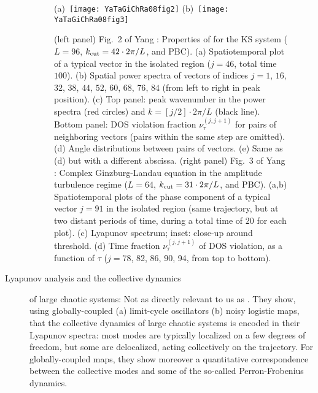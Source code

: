 \begin{description}
\begin{figure}
 (a)~\texttt{[image: YaTaGiChRa08fig2]}
 (b)~\texttt{[image: YaTaGiChRa08fig3]}
\caption{
(left panel)
Fig.~2 of Yang \etal{}:
Properties of {\cLvs} for the KS system
($L = 96$, $k_{\rm cut} = 42 \cdot 2\pi/L$, and PBC).
(a) Spatiotemporal plot of a typical vector in the isolated region
($j=46$, total time $100$).
(b) Spatial power spectra of vectors of indices
$j = 1$, $16$, $32$, $38$, $44$, $52$, $60$, $68$, $76$, $84$
(from left to right in peak position).
(c) Top panel: peak wavenumber in the power spectra (red circles)
and $k = [j/2] \cdot 2\pi/L$ (black line).
Bottom panel: DOS violation fraction $\nu^{(j,j+1)}_\tau$ for pairs of
neighboring vectors (pairs within the same step are omitted).
(d) Angle distributions between pairs of vectors.
(e) Same as (d) but with a different abscissa.
(right panel)
Fig.~3 of Yang \etal{}:
Complex Ginzburg-Landau equation in the amplitude turbulence regime
($L = 64$, $k_{\rm cut} = 31 \cdot 2\pi/L$, and PBC).
(a,b) Spatiotemporal plots of the phase component of a typical vector $j = 91$ in the isolated region
(same trajectory, but at two distant periods of time, during a total time of $20$ for each plot).
(c) Lyapunov spectrum; inset: close-up around threshold.
(d) Time fraction $\nu^{(j,j+1)}_\tau$ of DOS violation, as a function of $\tau$
($j=78$, 82, 86, 90, 94, from top to bottom).
}
\label{fig:lyapSpecCLG}
\end{figure}



\item[Lyapunov analysis and the collective dynamics]
of large chaotic systems:
Not as directly relevant to us as .
They show, using globally-coupled (a) limit-cycle oscillators
(b) noisy logistic maps, that the collective dynamics
of large chaotic systems is encoded in their Lyapunov spectra:
most modes are typically localized on a few degrees of freedom,
but some are delocalized, acting collectively on the trajectory.
For globally-coupled maps, they show moreover a quantitative
correspondence between the collective modes and some of the
so-called Perron-Frobenius dynamics.



\end{description}
